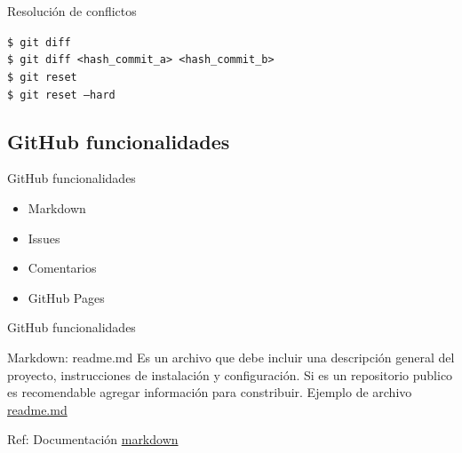 \documentclass{beamer}
\begin{document}
  \begin{frame} {Resolución de conflictos}  
    \begin{block}{}
      \texttt{\$ git diff} \\
      \texttt{\$ git diff <hash\_commit\_a> <hash\_commit\_b>}  \\
      \texttt{\$ git reset }  \\
      \texttt{\$ git reset --hard } 
    \end{block}

  
  \end{frame}


\subsection {GitHub funcionalidades}

\begin{frame}{GitHub funcionalidades}

  \begin{itemize}
    \LARGE
    \item Markdown
    \item Issues 
    \item Comentarios
    \item GitHub Pages
  \end{itemize}

\end{frame}


\begin{frame}{GitHub funcionalidades}

  \begin{exampleblock}{Markdown: readme.md}
    Es un archivo que debe incluir una descripción general del proyecto, instrucciones de instalación y configuración. 
    Si es un repositorio publico es recomendable agregar información para constribuir.
    Ejemplo de archivo \href{https://github.com/paobtorres/sistemas_dinamicos_I}{readme.md}
  \end{exampleblock}


  Ref: Documentación \href{https://docs.github.com/es/get-started/writing-on-github/getting-started-with-writing-and-formatting-on-github/quickstart-for-writing-on-github}{markdown}

\end{frame}
\end{document}
